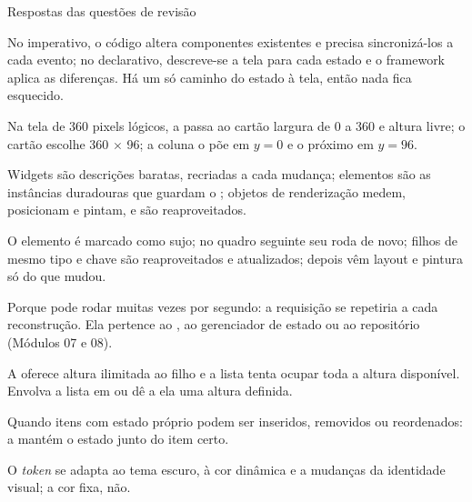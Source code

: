 \documentclass[aspectratio=169,10pt]{beamer}
\begin{document}
\begin{frame}{Respostas das questões de revisão}
  \begin{respostas}
    \item No imperativo, o código altera componentes existentes e precisa sincronizá-los a cada evento; no declarativo, descreve-se a tela para cada estado e o framework aplica as diferenças. Há um só caminho do estado à tela, então nada fica esquecido.
    \item Na tela de 360 pixels lógicos, a  passa ao cartão largura de 0 a 360 e altura livre; o cartão escolhe 360 $\times$ 96; a coluna o põe em $y = 0$ e o próximo em $y = 96$.
    \item Widgets são descrições baratas, recriadas a cada mudança; elementos são as instâncias duradouras que guardam o ; objetos de renderização medem, posicionam e pintam, e são reaproveitados.
    \item O elemento é marcado como sujo; no quadro seguinte seu  roda de novo; filhos de mesmo tipo e chave são reaproveitados e atualizados; depois vêm layout e pintura só do que mudou.
    \item Porque  pode rodar muitas vezes por segundo: a requisição se repetiria a cada reconstrução. Ela pertence ao , ao gerenciador de estado ou ao repositório (Módulos 07 e 08).
    \item A  oferece altura ilimitada ao filho e a lista tenta ocupar toda a altura disponível. Envolva a lista em  ou dê a ela uma altura definida.
    \item Quando itens com estado próprio podem ser inseridos, removidos ou reordenados: a  mantém o estado junto do item certo.
    \item O \emph{token} se adapta ao tema escuro, à cor dinâmica e a mudanças da identidade visual; a cor fixa, não.
  \end{respostas}
\end{frame}

\end{document}
